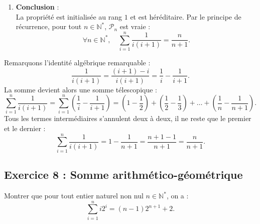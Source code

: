 \documentclass[11pt,a4paper]{article}
\newcommand{\N}{\mathbb{N}}
\begin{document}
\begin{correctionbox}
\begin{enumerate}[label=\textbf{\arabic*.}]
    \item \textbf{Conclusion} :\\
    La propriété est initialisée au rang $1$ et est héréditaire. Par le principe de récurrence, pour tout $n \in \N^*$, $\mathcal{P}_n$ est vraie :
    \[
    \forall n \in \N^*, \quad \sum_{i=1}^n \frac{1}{i(i+1)} = \frac{n}{n+1}.
    \]
\end{enumerate}
\end{correctionbox}

\begin{remarquabox}
Remarquons l'identité algébrique remarquable :
\[
\frac{1}{i(i+1)} = \frac{(i+1) - i}{i(i+1)} = \frac{1}{i} - \frac{1}{i+1}.
\]
La somme devient alors une somme télescopique :
\[
\sum_{i=1}^n \frac{1}{i(i+1)} = \sum_{i=1}^n \left(\frac{1}{i} - \frac{1}{i+1}\right) = \left(1 - \frac{1}{2}\right) + \left(\frac{1}{2} - \frac{1}{3}\right) + \dots + \left(\frac{1}{n} - \frac{1}{n+1}\right).
\]
Tous les termes intermédiaires s'annulent deux à deux, il ne reste que le premier et le dernier :
\[
\sum_{i=1}^n \frac{1}{i(i+1)} = 1 - \frac{1}{n+1} = \frac{n+1 - 1}{n+1} = \frac{n}{n+1}.
\]
\end{remarquabox}

\subsection*{Exercice 8 : Somme arithmético-géométrique}

Montrer que pour tout entier naturel non nul $n \in \N^*$, on a :
\[
\sum_{i=1}^n i 2^i = (n-1)2^{n+1} + 2.
\]
\end{document}
